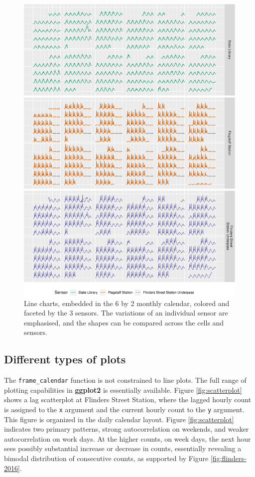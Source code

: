 \documentclass[12pt]{article}
\begin{document}
\begin{figure}

{\centering \includegraphics[width=\textwidth]{figure/facet-1} 

}

\caption{Line charts, embedded in the 6 by 2 monthly calendar, colored and faceted by the 3 sensors. The variations of an individual sensor are emphasised, and the shapes can be compared across the cells and sensors.}\label{fig:facet}
\end{figure}

\hypertarget{different-types-of-plots}{%
\subsection{Different types of plots}\label{different-types-of-plots}}

The \texttt{frame\_calendar} function is not constrained to line plots.
The full range of plotting capabilities in \textbf{ggplot2} is
essentially available. Figure \ref{fig:scatterplot} shows a lag
scatterplot at Flinders Street Station, where the lagged hourly count is
assigned to the \texttt{x} argument and the current hourly count to the
\texttt{y} argument. This figure is organized in the daily calendar
layout. Figure \ref{fig:scatterplot} indicates two primary patterns,
strong autocorrelation on weekends, and weaker autocorrelation on work
days. At the higher counts, on week days, the next hour sees possibly
substantial increase or decrease in counts, essentially revealing a
bimodal distribution of consecutive counts, as supported by Figure
\ref{fig:flinders-2016}.
\end{document}
